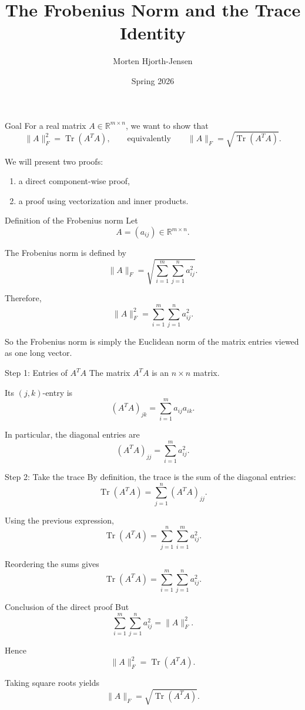 \documentclass[aspectratio=169]{beamer}
\title{The Frobenius Norm and the Trace Identity}
\author{Morten Hjorth-Jensen}
\date{Spring 2026}
\begin{document}
\frame{\titlepage}

\begin{frame}{Goal}
For a real matrix \(A\in\mathbb{R}^{m\times n}\), we want to show that
\[
\|A\|_F^2=\operatorname{Tr}(A^T A),
\qquad
\text{equivalently}
\qquad
\|A\|_F=\sqrt{\operatorname{Tr}(A^T A)}.
\]

We will present two proofs:
\begin{enumerate}
\item a direct component-wise proof,
\item a proof using vectorization and inner products.
\end{enumerate}
\end{frame}

\begin{frame}{Definition of the Frobenius norm}
Let
\[
A=(a_{ij}) \in \mathbb{R}^{m\times n}.
\]

The Frobenius norm is defined by
\[
\|A\|_F
=
\sqrt{\sum_{i=1}^{m}\sum_{j=1}^{n} a_{ij}^2 }.
\]

Therefore,
\[
\|A\|_F^2
=
\sum_{i=1}^{m}\sum_{j=1}^{n} a_{ij}^2.
\]

So the Frobenius norm is simply the Euclidean norm of the matrix entries viewed as one long vector.
\end{frame}

\begin{frame}{Step 1: Entries of \(A^T A\)}
The matrix \(A^T A\) is an \(n\times n\) matrix.

Its \((j,k)\)-entry is
\[
(A^T A)_{jk}
=
\sum_{i=1}^{m} a_{ij}a_{ik}.
\]

In particular, the diagonal entries are
\[
(A^T A)_{jj}
=
\sum_{i=1}^{m} a_{ij}^2.
\]
\end{frame}

\begin{frame}{Step 2: Take the trace}
By definition, the trace is the sum of the diagonal entries:
\[
\operatorname{Tr}(A^T A)
=
\sum_{j=1}^{n}(A^T A)_{jj}.
\]

Using the previous expression,
\[
\operatorname{Tr}(A^T A)
=
\sum_{j=1}^{n}\sum_{i=1}^{m} a_{ij}^2.
\]

Reordering the sums gives
\[
\operatorname{Tr}(A^T A)
=
\sum_{i=1}^{m}\sum_{j=1}^{n} a_{ij}^2.
\]
\end{frame}

\begin{frame}{Conclusion of the direct proof}
But
\[
\sum_{i=1}^{m}\sum_{j=1}^{n} a_{ij}^2
=
\|A\|_F^2.
\]

Hence
\[
\boxed{\|A\|_F^2=\operatorname{Tr}(A^T A)}.
\]

Taking square roots yields
\[
\boxed{\|A\|_F=\sqrt{\operatorname{Tr}(A^T A)}}.
\]
\end{frame}
\end{document}

